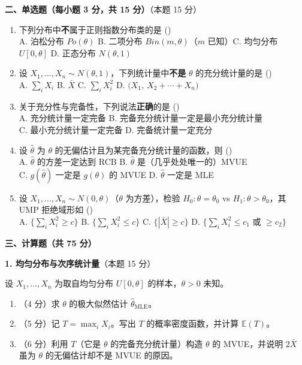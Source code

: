 \documentclass[12pt,a4paper]{ctexart}
\newcommand{\question}[2]{\bigskip\noindent\textbf{#1}\quad（本题 #2 分）\par\nobreak\medskip}
\newcommand{\E}{\mathbb{E}}
\begin{document}
\question{二、单选题（每小题 3 分，共 15 分）}{15}
\begin{enumerate}[label=\arabic*.,leftmargin=2.0em]
  \item 下列分布中\textbf{不}属于正则指数分布类的是 \hfill(\underline{\hspace{1.2cm}})\\
  A. 泊松分布 $Po(\theta)$ \quad B. 二项分布 $Bin(m,\theta)$（$m$ 已知）\quad C. 均匀分布 $U[0,\theta]$ \quad D. 正态分布 $N(\theta,1)$
  \item 设 $X_1,\dots,X_n\sim N(\theta,1)$，下列统计量中\textbf{不是} $\theta$ 的充分统计量的是 \hfill(\underline{\hspace{1.2cm}})\\
  A. $\sum_i X_i$ \quad B. $\bar X$ \quad C. $\sum_i X_i^2$ \quad D. $\big(X_1,\ X_2+\cdots+X_n\big)$
  \item 关于充分性与完备性，下列说法\textbf{正确}的是 \hfill(\underline{\hspace{1.2cm}})\\
  A. 充分统计量一定完备 \quad B. 完备充分统计量一定是最小充分统计量\\
  C. 最小充分统计量一定完备 \quad D. 完备统计量一定充分
  \item 设 $\hat\theta$ 为 $\theta$ 的无偏估计且为某完备充分统计量的函数，则 \hfill(\underline{\hspace{1.2cm}})\\
  A. $\hat\theta$ 的方差一定达到 RCB \quad B. $\hat\theta$ 是（几乎处处唯一的）MVUE\\
  C. $g(\hat\theta)$ 一定是 $g(\theta)$ 的 MVUE \quad D. $\hat\theta$ 一定是 MLE
  \item 设 $X_1,\dots,X_n\sim N(0,\theta)$（$\theta$ 为方差），检验 $H_0:\theta=\theta_0$ vs $H_1:\theta>\theta_0$，其 UMP 拒绝域形如 \hfill(\underline{\hspace{1.2cm}})\\
  A. $\{\sum_i X_i^2\ge c\}$ \quad B. $\{\sum_i X_i^2\le c\}$ \quad C. $\{|\bar X|\ge c\}$ \quad D. $\{\sum_i X_i^2\le c_1\text{ 或 }\ge c_2\}$
\end{enumerate}

\bigskip
\begin{center}\textbf{三、计算题（共 75 分）}\end{center}

\question{1. 均匀分布与次序统计量}{15}
设 $X_1,\dots,X_n$ 为取自均匀分布 $U[0,\theta]$ 的样本，$\theta>0$ 未知。
\begin{enumerate}[label=(\arabic*),leftmargin=2.2em]
  \item （4 分）求 $\theta$ 的极大似然估计 $\hat\theta_{\text{MLE}}$。
  \item （5 分）记 $T=\max_i X_i$。写出 $T$ 的概率密度函数，并计算 $\E(T)$。
  \item （6 分）利用 $T$（它是 $\theta$ 的完备充分统计量）构造 $\theta$ 的 MVUE，并说明 $2\bar X$ 虽为 $\theta$ 的无偏估计却不是 MVUE 的原因。
\end{enumerate}
\end{document}
